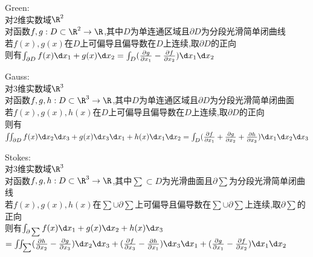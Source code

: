 \begin{dingli}
Green:\\
对$2$维实数域$\R^2$\\
对函数$f,g:D\subset \R^2 \to \R$,其中$D$为单连通区域且$\partial D$为分段光滑简单闭曲线\\
若$f(x),g(x)$在$D$上可偏导且偏导数在$D$上连续,取$\partial D$的正向\\
则有$\int_{\partial D}f(x)\d x_1+g(x)\d x_2=\int_{D}(\frac{\partial g }{\partial x_1}-\frac{\partial f }{\partial x_2})\d x_1\d x_2$
\end{dingli}

\begin{dingli}
Gauss:\\
对$3$维实数域$\R^3$\\
对函数$f,g,h:D\subset \R^3 \to \R$,其中$D$为单连通区域且$\partial D$为分段光滑简单闭曲面\\
若$f(x),g(x),h(x)$在$D$上可偏导且偏导数在$D$上连续,取$\partial D$的正向\\
则有$\iint_{\partial D}f(x)\d x_2\d x_3+g(x)\d x_3\d x_1+h(x)\d x_1\d x_2=\int_{D}(\frac{\partial f }{\partial x_1}+\frac{\partial g }{\partial x_2}+\frac{\partial h }{\partial x_3})\d x_1\d x_2\d x_3$
\end{dingli}

\begin{dingli}
Stokes:\\
对$3$维实数域$\R^3$\\
对函数$f,g,h:D\subset \R^3 \to \R$,其中$\sum\subset D$为光滑曲面且$\partial\sum$为分段光滑简单闭曲线\\
若$f(x),g(x),h(x)$在$\sum\cup\partial\sum$上可偏导且偏导数在$\sum\cup\partial\sum$上连续,取$\partial \sum$的正向\\
则有$\int_{\partial \sum}f(x)\d x_1+g(x)\d x_2+h(x)\d x_3$\\
\hspace*{2em}$=\iint_{\sum}(\frac{\partial h }{\partial x_2}-\frac{\partial g }{\partial x_3})\d x_2\d x_3+(\frac{\partial f}{\partial x_3}-\frac{\partial h }{\partial x_1})\d x_3\d x_1+(\frac{\partial g }{\partial x_1}-\frac{\partial f}{\partial x_2})\d x_1\d x_2$
\end{dingli}

\endinput
%